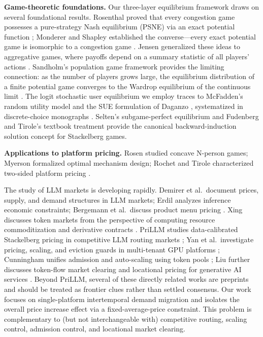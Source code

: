\documentclass[11pt]{article}
\begin{document}
\textbf{Game-theoretic foundations.} Our three-layer equilibrium framework
draws on several foundational results. Rosenthal proved that every
congestion game possesses a pure-strategy Nash equilibrium (PSNE) via an
exact potential function \cite{rosenthal1973class}; Monderer and Shapley
established the converse---every exact potential game is isomorphic to a
congestion game \cite{monderer1996potential}. Jensen generalized these ideas
to aggregative games, where payoffs depend on a summary statistic of all
players' actions \cite{jensen2010aggregative}. Sandholm's population game
framework provides the limiting connection: as the number of players grows
large, the equilibrium distribution of a finite potential game converges to
the Wardrop equilibrium of the continuous limit
\cite{sandholm2010population,wardrop1952some}. The logit stochastic user
equilibrium we employ traces to McFadden's random utility model
\cite{mcfadden1974conditional} and the SUE formulation of Daganzo
\cite{daganzo1979multinomial}, systematized in discrete-choice monographs
\cite{anderson1992discrete,train2009discrete}. Selten's subgame-perfect
equilibrium \cite{selten1965spieltheoretische} and Fudenberg and Tirole's
textbook treatment \cite{fudenberg1991game} provide the canonical
backward-induction solution concept for Stackelberg games.

\textbf{Applications to platform pricing.} Rosen studied concave N-person
games; Myerson formalized optimal mechanism design; Rochet and Tirole
characterized two-sided platform pricing
\cite{rosen1965existence,myerson1981optimal,rochet2003platform}.

The study of LLM markets is developing rapidly. Demirer et al.\ document
prices, supply, and demand structures in LLM markets; Erdil analyzes
inference economic constraints; Bergemann et al.\ discuss product menu
pricing \cite{demirer2025emerging,erdil2025inference,bergemann2025menu}.
Xing discusses token markets from the perspective of computing resource
commoditization and derivative contracts
\cite{xing2026tokenfutures}. PriLLM studies data-calibrated Stackelberg
pricing in competitive LLM routing markets \cite{guo2026prillm};
Yan et al.\ investigate pricing, scaling, and eviction guards in
multi-tenant GPU platforms \cite{yan2026stackelberg};
Cunningham unifies admission and auto-scaling using token pools
\cite{cunningham2026token};
Liu further discusses token-flow market clearing and locational pricing
for generative AI services \cite{liu2026locational}.
Beyond PriLLM, several of these directly related works are preprints and
should be treated as frontier clues rather than settled consensus.
Our work focuses on single-platform intertemporal demand migration and
isolates the overall price increase effect via a fixed-average-price
constraint. This problem is complementary to (but not interchangeable with)
competitive routing, scaling control, admission control, and locational
market clearing.
\end{document}
